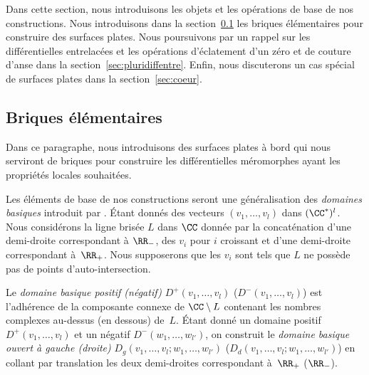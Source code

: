 Dans cette section, nous introduisons les objets et les opérations de base de nos constructions. Nous introduisons dans la section~\ref{sec:briques} les briques élémentaires pour construire des surfaces plates. Nous poursuivons par un rappel sur les différentielles entrelacées et les opérations d’éclatement d'un zéro et de couture d'anse dans la section~\ref{sec:pluridiffentre}. Enfin, nous discuterons un cas spécial de surfaces plates dans la section~\ref{sec:coeur}.

\subsection{Briques élémentaires}
\label{sec:briques}

Dans ce paragraphe, nous introduisons des surfaces plates à bord qui nous serviront de briques pour construire les différentielles méromorphes ayant les propriétés locales souhaitées.

Les éléments de base de nos constructions seront une généralisation des \emph{domaines basiques} introduit par \cite{Bo}. Étant donnés des vecteurs $(v_{1},\dots,v_{l})$ dans $(\CC^{\ast})^{l}$. Nous considérons la ligne brisée $L$ dans $\CC$ donnée par la concaténation d'une demi-droite correspondant à $\RR_{-}$, des $v_{i}$ pour $i$ croissant et d'une demi-droite correspondant à~$\RR_{+}$.
Nous supposerons que les $v_{i}$ sont tels que $L$ ne possède pas de points d'auto-intersection.

Le \emph{domaine basique positif (\resp négatif)} $D^{+}(v_{1},\dots,v_{l})$ (\resp $D^{-}(v_{1},\dots,v_{l})$) est l'adhérence de la composante connexe de $\CC\setminus L$ contenant les nombres complexes au-dessus (\resp en dessous) de~$L$.
Étant donné un domaine positif $D^{+}(v_{1},\dots,v_{l})$ et un négatif $D^{-}(w_{1},\dots,w_{l'})$, on construit le \emph{domaine basique ouvert à gauche (\resp droite)} $D_{g}(v_{1},\dots,v_{l};w_{1},\dots,w_{l'})$ (\resp $D_{d}(v_{1},\dots,v_{l};w_{1},\dots,w_{l'})$) en collant par translation les deux demi-droites correspondant à~$\RR_{+}$ (\resp $\RR_{-}$).

